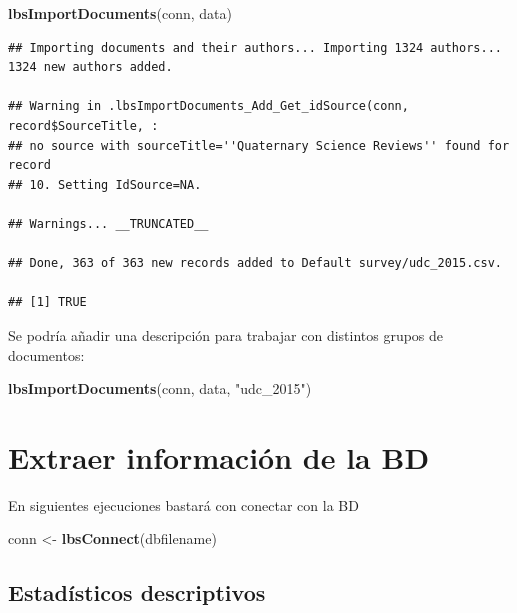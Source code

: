 \documentclass[]{book}
\newenvironment{Shaded}{\begin{snugshade}}{\end{snugshade}}
\newcommand{\KeywordTok}[1]{\textcolor[rgb]{0.13,0.29,0.53}{\textbf{#1}}}
\newcommand{\NormalTok}[1]{#1}
\newcommand{\StringTok}[1]{\textcolor[rgb]{0.31,0.60,0.02}{#1}}
\begin{document}
\begin{Shaded}
\begin{Highlighting}[]
\KeywordTok{lbsImportDocuments}\NormalTok{(conn, data) }
\end{Highlighting}
\end{Shaded}

\begin{verbatim}
## Importing documents and their authors... Importing 1324 authors... 1324 new authors added.

## Warning in .lbsImportDocuments_Add_Get_idSource(conn, record$SourceTitle, :
## no source with sourceTitle=''Quaternary Science Reviews'' found for record
## 10. Setting IdSource=NA.

## Warnings... __TRUNCATED__

## Done, 363 of 363 new records added to Default survey/udc_2015.csv.

## [1] TRUE
\end{verbatim}

Se podría añadir una descripción para trabajar con distintos grupos de documentos:

\begin{Shaded}
\begin{Highlighting}[]
\KeywordTok{lbsImportDocuments}\NormalTok{(conn, data, }\StringTok{"udc_2015"}\NormalTok{) }
\end{Highlighting}
\end{Shaded}

\hypertarget{extraer-informacion-de-la-bd}{%
\section{Extraer información de la BD}\label{extraer-informacion-de-la-bd}}

En siguientes ejecuciones bastará con conectar con la BD

\begin{Shaded}
\begin{Highlighting}[]
\NormalTok{conn <-}\StringTok{ }\KeywordTok{lbsConnect}\NormalTok{(dbfilename)}
\end{Highlighting}
\end{Shaded}

\hypertarget{estadisticos-descriptivos}{%
\subsection{Estadísticos descriptivos}\label{estadisticos-descriptivos}}
\end{document}
